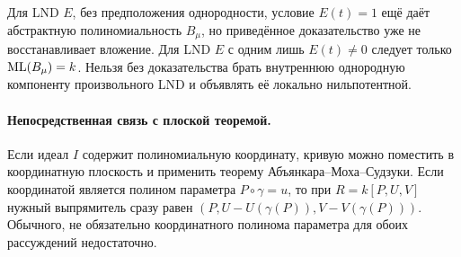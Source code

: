 Для LND $E$, без предположения однородности, условие $E(t)=1$ ещё даёт абстрактную полиномиальность
$B_\mu$, но приведённое доказательство уже не восстанавливает вложение.
Для LND $E$ с одним лишь $E(t)\ne0$ следует только $\operatorname{ML}(B_\mu)=k$.
Нельзя без доказательства брать внутреннюю однородную компоненту
произвольного LND и объявлять её локально нильпотентной.

\paragraph{Непосредственная связь с плоской теоремой.}
Если идеал $I$ содержит полиномиальную координату, кривую можно
поместить в координатную плоскость и применить теорему
Абъянкара--Моха--Судзуки. Если координатой является полином параметра
$P\circ\gamma=u$, то при $R=k[P,U,V]$ нужный выпрямитель сразу равен
$(P,U-U(\gamma(P)),V-V(\gamma(P)))$.
Обычного, не обязательно координатного полинома параметра для обоих
рассуждений недостаточно.
